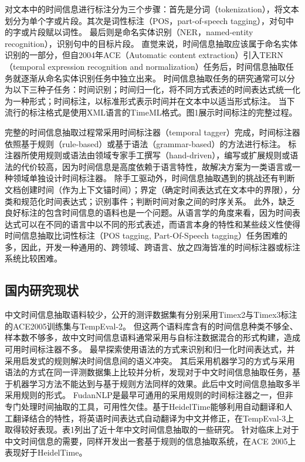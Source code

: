对文本中的时间信息进行标注分为三个步骤：首先是分词（tokenization），将文本划分为单个字或片段。其次是词性标注（POS，part-of-speech tagging），对句中的字或片段赋以词性。
最后则是命名实体识别（NER，named-entity recognition），识别句中的目标片段。
直觉来说，时间信息抽取应该属于命名实体识别的一部分，但自2004年ACE\cite{doddington2004automatic}（Automatic content extraction）引入TERN（temporal expression recognition and normalization）任务后，时间信息抽取任务就逐渐从命名实体识别任务中独立出来。
时间信息抽取任务的研究通常可以分为以下三种子任务：时间识别；时间归一化，将不同方式表述的时间表达式统一化为一种形式；时间标注，以标准形式表示时间并在文本中以适当形式标注。
当下流行的标注格式是使用XML语言的TimeML\cite{pustejovsky2003timeml}格式。图1展示时间标注的完整过程。

完整的时间信息抽取过程常采用时间标注器（temporal tagger）完成，时间标注器依照基于规则（rule-based）或基于语法（grammar-based）的方法进行标注。
标注器所使用规则或语法由领域专家手工撰写（hand-driven），编写或扩展规则或语法的代价较高，因为时间信息是高度依赖于语言特性，故解决方案为一类语言或一种领域单独设计时间标注器。
除手工驱动外，时间信息抽取遇到的挑战还有判断文档创建时间（作为上下文锚时间）；界定（确定时间表达式在文本中的界限），分类和规范化时间表达式；识别事件；判断时间对象之间的时序关系。
此外，缺乏良好标注的包含时间信息的语料也是一个问题。从语言学的角度来看，因为时间表达式可以在不同的语言中以不同的形式表述，而语言本身的特性和某些歧义性使得时间信息抽取比词性标注（POS tagging, Part-Of-Speech tagging）任务困难的多，因此，开发一种通用的、跨领域、跨语言、放之四海皆准的时间标注器或标注系统比较困难。

\subsection{国内研究现状}

中文时间信息抽取语料较少，公开的测评数据集有分别采用Timex2与Timex3标注的ACE2005训练集与TempEval-2。
但这两个语料库含有的时间信息种类不够全、样本数不够多，故中文时间信息语料通常采用与自标注数据混合的形式构建，造成可用时间标注器不多。
\citet{mingli2005ctemp}最早探索使用语法的方式来识别和归一化时间表达式，并采用启发式的规则解决时间信息间的语义冲突。
其后\citet{wu2005normalizing}采用机器学习的方式与采用语法的方式在同一评测数据集上比较并分析，发现对于中文时间信息抽取任务，基于机器学习方法不能达到与基于规则方法同样的效果。此后中文时间信息抽取多半采用规则的形式。
FudanNLP\cite{qiu2013fudannlp}是最早可通用的采用规则的时间标注器之一，但非专门处理时间抽取的工具，可用性欠佳。\citet{li2014chinese}基于HeidelTime能够利用自动翻译和人工翻译结合的特性，将英语时间表达式自动翻译为中文并修正，在TempEval-3上取得较好表现。表1列出了近十年中文时间信息抽取的一些研究。
\citet{liu2016cmedtex}针对临床上对于中文时间信息的需要，同样开发出一套基于规则的信息抽取系统，在ACE 2005上表现好于HeidelTime。

